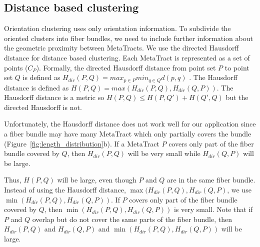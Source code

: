   
\subsection{Distance based clustering}
 \label{subsec:dist_clustering}
Orientation clustering uses only orientation information. To subdivide the oriented clusters into fiber bundles, we need to include further information about the geometric proximity between MetaTracts. We use the directed Hausdorff distance for distance based clustering.
Each MetaTract is represented as a set of points ($C_P$). Formally, the directed Hausdorff distance from point set $P$ to point set $Q$ is defined as 
$H_{dir}(P,Q) = max_{p \in P} min_{q \in Q} d(p,q)$ .
The Hausdorff distance is defined as $H(P,Q) = max(H_{dir}(P,Q),H_{dir}(Q,P))$.
The Hausdorff distance is a metric so $H(P,Q) \le H(P,Q') + H(Q',Q)$ but the directed Hausdorff is not.

Unfortunately, the Hausdorff distance does not work well for our application since a fiber bundle may have many MetaTract which only partially covers the bundle (Figure~\ref{fig:length_distribution}b). If a MetaTract $P$ covers only part of the fiber bundle covered by $Q$, then $H_{dir}(P,Q)$ will be very small while $H_{dir}(Q,P)$ will be large.

Thus, $H(P,Q)$ will be large, even though $P$ and $Q$ are in the same fiber bundle.
Instead of using the Hausdorff distance, $\max(H_{dir}(P,Q),H_{dir}(Q,P)$, we use $\min(H_{dir}(P,Q),H_{dir}(Q,P))$. If $P$ covers only part of the fiber bundle covered by $Q$, then $\min(H_{dir}(P,Q),H_{dir}(Q,P))$ is very small.
Note that if $P$ and $Q$ overlap but do not cover the same parts of the fiber bundle, then $H_{dir}(P,Q)$ and $H_{dir}(Q,P)$ and $\min(H_{dir}(P,Q),H_{dir}(Q,P))$ will be large.
 
